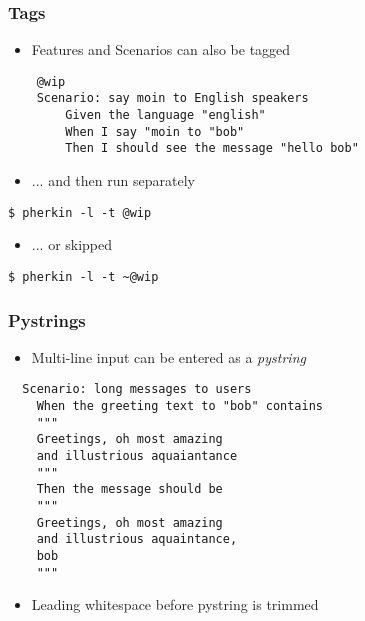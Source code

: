 \documentclass[10pt]{vcs_beamer}
\begin{document}
\begin{frame}[fragile]
\frametitle{Tags}

\begin{itemize}
    \item Features and Scenarios can also be tagged
\end{itemize}

\begin{lstlisting}
    @wip
    Scenario: say moin to English speakers
        Given the language "english"
        When I say "moin to "bob"
        Then I should see the message "hello bob"
\end{lstlisting}

\begin{itemize}
    \item ... and then run separately
\end{itemize}
\begin{lstlisting}
$ pherkin -l -t @wip
\end{lstlisting}

\begin{itemize}
    \item ... or skipped
\end{itemize}
\begin{lstlisting}
$ pherkin -l -t ~@wip
\end{lstlisting}

\end{frame}

\begin{frame}[fragile]
\frametitle{Pystrings}

\begin{itemize}
    \item Multi-line input can be entered as a \emph{pystring}
\end{itemize}

\begin{lstlisting}
  Scenario: long messages to users
    When the greeting text to "bob" contains
    """
    Greetings, oh most amazing
    and illustrious aquaiantance
    """
    Then the message should be
    """
    Greetings, oh most amazing
    and illustrious aquaintance,
    bob
    """
\end{lstlisting}

\begin{itemize}
    \item Leading whitespace before pystring is trimmed
\end{itemize}

\end{frame}
\end{document}
